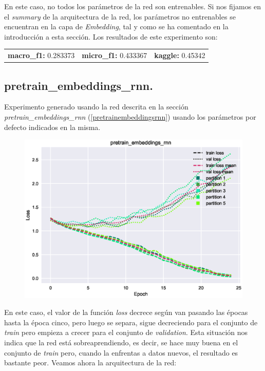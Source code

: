 \documentclass[11pt]{article}
\begin{document}
En este caso, no todos los parámetros de la red son entrenables. Si nos fijamos en el \textit{summary} de la arquitectura de la red, los parámetros no entrenables se encuentran en la capa de \textit{Embedding}, tal y como se ha comentado en la introducción a esta sección. Los resultados de este experimento son: 

\begin{table}[H]
\begin{tabular}{c|c|c}
\textbf{macro\_f1:} 0.283373 & \textbf{micro\_f1:} 0.433367 & \textbf{kaggle:} 0.45342
\end{tabular}
\end{table}

\subsection{pretrain\_embeddings\_rnn.} \label{exp_pretrainembeddingsrnn}

Experimento generado usando la red descrita en la sección \textit{pretrain\_embeddings\_rnn} (\ref{pretrainembeddingsrnn}) usando los parámetros por defecto indicados en la misma.

\begin{figure}[H]
\includegraphics[width=\linewidth]{images/loss/pretrain_embeddings_rnn-1554203298.eps}
\end{figure}

En este caso, el valor de la función \textit{loss} decrece según van pasando las épocas hasta la época cinco, pero luego se separa, sigue decreciendo para el conjunto de \textit{train} pero empieza a crecer para el conjunto de \textit{validation}. Esta situación nos indica que la red está sobreaprendiendo, es decir, se hace muy buena en el conjunto de \textit{train} pero, cuando la enfrentas a datos nuevos, el resultado es bastante peor. Veamos ahora la arquitectura de la red:
\end{document}
